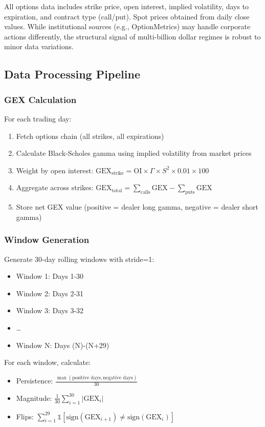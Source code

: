 All options data includes strike price, open interest, implied volatility, days to expiration, and contract type (call/put). Spot prices obtained from daily close values. While institutional sources (e.g., OptionMetrics) may handle corporate actions differently, the structural signal of multi-billion dollar regimes is robust to minor data variations.

\subsection{Data Processing Pipeline}

\subsubsection{GEX Calculation}

For each trading day:
\begin{enumerate}
\item Fetch options chain (all strikes, all expirations)
\item Calculate Black-Scholes gamma using implied volatility from market prices
\item Weight by open interest: $\text{GEX}_{\text{strike}} = \text{OI} \times \Gamma \times S^2 \times 0.01 \times 100$
\item Aggregate across strikes: $\text{GEX}_{\text{total}} = \sum_{\text{calls}} \text{GEX} - \sum_{\text{puts}} \text{GEX}$
\item Store net GEX value (positive = dealer long gamma, negative = dealer short gamma)
\end{enumerate}

\subsubsection{Window Generation}

Generate 30-day rolling windows with stride=1:
\begin{itemize}
\item Window 1: Days 1-30
\item Window 2: Days 2-31
\item Window 3: Days 3-32
\item \ldots
\item Window N: Days (N)-(N+29)
\end{itemize}

For each window, calculate:
\begin{itemize}
\item Persistence: $\frac{\max(\text{positive days}, \text{negative days})}{30}$
\item Magnitude: $\frac{1}{30}\sum_{i=1}^{30} |\text{GEX}_i|$
\item Flips: $\sum_{i=1}^{29} \mathbb{1}[\text{sign}(\text{GEX}_{i+1}) \neq \text{sign}(\text{GEX}_i)]$
\end{itemize}

